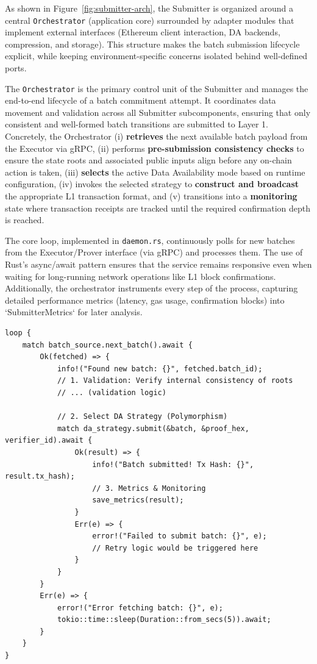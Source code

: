As shown in Figure~\ref{fig:submitter-arch}, the Submitter is organized around a central \texttt{Orchestrator} (application core) surrounded by adapter modules that implement external interfaces (Ethereum client interaction, DA backends, compression, and storage). This structure makes the batch submission lifecycle explicit, while keeping environment-specific concerns isolated behind well-defined ports.


The \texttt{Orchestrator} is the primary control unit of the Submitter and manages the end-to-end lifecycle of a batch commitment attempt. It coordinates data movement and validation across all Submitter subcomponents, ensuring that only consistent and well-formed batch transitions are submitted to Layer 1. Concretely, the Orchestrator (i) \textbf{retrieves} the next available batch payload from the Executor via gRPC, (ii) performs \textbf{pre-submission consistency checks} to ensure the state roots and associated public inputs align before any on-chain action is taken, (iii) \textbf{selects} the active Data Availability mode based on runtime configuration, (iv) invokes the selected strategy to \textbf{construct and broadcast} the appropriate L1 transaction format, and (v) transitions into a \textbf{monitoring} state where transaction receipts are tracked until the required confirmation depth is reached.

The core loop, implemented in \texttt{daemon.rs}, continuously polls for new batches from the Executor/Prover interface (via gRPC) and processes them. The use of Rust's async/await pattern ensures that the service remains responsive even when waiting for long-running network operations like L1 block confirmations. Additionally, the orchestrator instruments every step of the process, capturing detailed performance metrics (latency, gas usage, confirmation blocks) into `SubmitterMetrics` for later analysis.

\begin{lstlisting}[style=rustStyle, caption={Submitter Orchestration Loop}, label={lst:submitter-loop}]
loop {
    match batch_source.next_batch().await {
        Ok(fetched) => {
            info!("Found new batch: {}", fetched.batch_id);
            // 1. Validation: Verify internal consistency of roots
            // ... (validation logic)

            // 2. Select DA Strategy (Polymorphism)
            match da_strategy.submit(&batch, &proof_hex, verifier_id).await {
                Ok(result) => {
                    info!("Batch submitted! Tx Hash: {}", result.tx_hash);
                    // 3. Metrics & Monitoring
                    save_metrics(result);
                }
                Err(e) => {
                    error!("Failed to submit batch: {}", e);
                    // Retry logic would be triggered here
                }
            }
        }
        Err(e) => {
            error!("Error fetching batch: {}", e);
            tokio::time::sleep(Duration::from_secs(5)).await;
        }
    }
}
\end{lstlisting}


